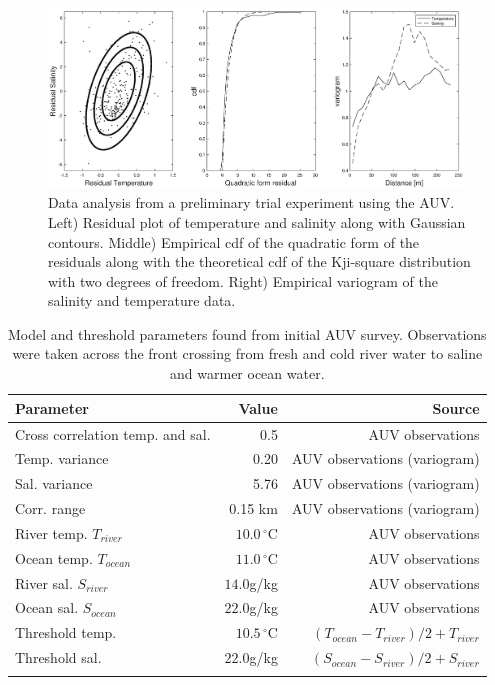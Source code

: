 \documentclass[aoas]{imsart}
\begin{document}
\begin{figure}[!h] 
 \centering 
\includegraphics[width=0.98\textwidth]{Figures/field-trials/res_diag.eps}
\caption{Data analysis from a preliminary trial experiment using the AUV. Left) Residual plot of temperature and salinity along with Gaussian contours. Middle) Empirical cdf of the quadratic form of the residuals along with the theoretical cdf of the Kji-square distribution with two degrees of freedom. Right) Empirical variogram of the salinity and temperature data.} \label{fig:parest}
\end{figure}

\begin{table}[!h]
\centering
\begin{tabular}{lrr}
\toprule
Parameter & Value & Source\\
\midrule
\rowcolor{Gray}
Cross correlation temp. and sal. & 0.5 & AUV observations\\
Temp. variance &  0.20 & AUV observations (variogram)\\
\rowcolor{Gray}
Sal. variance &  5.76 & AUV observations (variogram)\\
Corr. range  & 0.15 km & AUV observations (variogram)\\
\rowcolor{Gray}
River temp. $T_{river}$ & $10.0\,^{\circ}\mathrm{C}$ & AUV observations\\
Ocean temp. $T_{ocean}$ & $11.0\,^{\circ}\mathrm{C}$ & AUV observations\\
\rowcolor{Gray}
River sal. $S_{river}$ & $14.0$g/kg & AUV observations\\
Ocean sal. $S_{ocean}$ & $22.0$g/kg & AUV observations\\
\rowcolor{Gray}
Threshold temp. & $10.5\,^{\circ}\mathrm{C}$ & $(T_{ocean}-T_{river})/2+T_{river}$\\
Threshold sal. & $22.0$g/kg & $(S_{ocean}-S_{river})/2+S_{river}$\\
\rowcolor{Gray}
\bottomrule
\end{tabular}
\caption{Model and threshold parameters found from initial AUV survey. Observations were taken across the front crossing from fresh and cold river water to saline and warmer ocean water.}
\label{tab:experiment_param}
\end{table}
\end{document}
